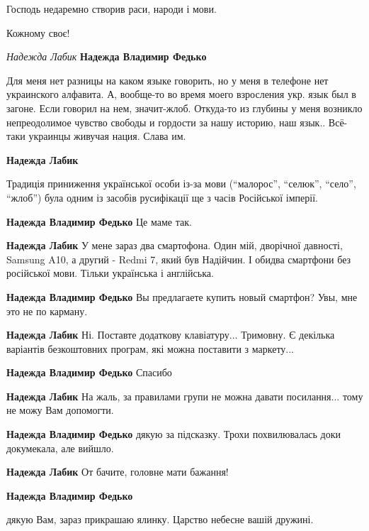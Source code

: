 \begin{itemize}
Господь недаремно створив раси, народи і мови.

Кожному своє!

\begin{itemize} %
\emph{Надежда Лабик}
\textbf{Надежда Владимир Федько} 

Для меня нет разницы на каком языке говорить, но у меня в телефоне нет
украинского алфавита. А, вообще-то во время моего взросления укр. язык был в
загоне. Если говорил на нем, значит-жлоб. Откуда-то из глубины у меня возникло
непреодолимое чувство свободы и гордости за нашу историю, наш язык.. Всё-таки
украинцы живучая нация. Слава им.

\begin{itemize} %
\textbf{Надежда Лабик} 

Традиція приниження української особи із-за мови (\enquote{малорос}, \enquote{селюк}, \enquote{село},
\enquote{жлоб}) була одним із засобів русифікації ще з часів Російської імперії.


\textbf{Надежда Владимир Федько} Це маме так.

\textbf{Надежда Лабик} У мене зараз два смартофона. Один мій, дворічної давності, Samsung A10, а другий - Redmi 7, який був Надійчин.
І обидва смартфони без російської мови. Тільки українська і англійська.

\textbf{Надежда Владимир Федько} Вы предлагаете купить новый смартфон? Увы, мне это не по карману.

\textbf{Надежда Лабик} Ні. Поставте додаткову клавіатуру... Тримовну. Є декілька варіантів безкоштовних програм, які можна поставити з маркету...

\textbf{Надежда Владимир Федько} Спасибо

\textbf{Надежда Лабик} На жаль, за правилами групи не можна давати посилання... тому не можу Вам допомогти.

\textbf{Надежда Владимир Федько} дякую за підсказку. Трохи похвилювалась доки докумекала, але вийшло.

\textbf{Надежда Лабик} От бачите, головне мати бажання!
\end{itemize} %

\textbf{Надежда Владимир Федько} 

дякую Вам, зараз прикрашаю ялинку. Царство небесне вашій дружині.


\end{itemize}
\end{itemize}
